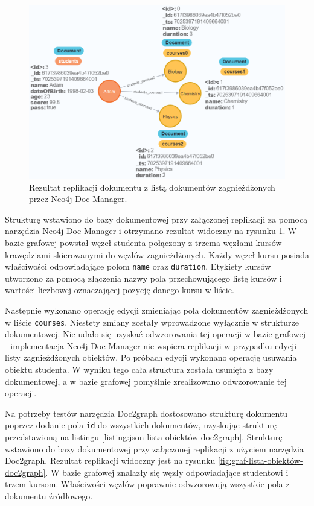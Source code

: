 \documentclass[a4paper,twoside,12pt]{book}
\begin{document}
\begin{figure}[h]
\centering
\includegraphics[width=11.4cm]{images/lista_obiektów_neo4jdocmanager.png}
\caption{Rezultat replikacji dokumentu z listą dokumentów zagnieżdżonych przez Neo4j Doc Manager.}
\label{fig:graf-lista-obiektów-neo4jdocmanager}
\end{figure}

Strukturę wstawiono do bazy dokumentowej przy załączonej replikacji za pomocą narzędzia Neo4j Doc Manager i otrzymano rezultat widoczny na rysunku \ref{fig:graf-lista-obiektów-neo4jdocmanager}. W bazie grafowej powstał węzeł studenta połączony z trzema węzłami kursów krawędziami skierowanymi do węzłów zagnieżdżonych. 
Każdy węzeł kursu posiada właściwości odpowiadające polom \texttt{name} oraz \texttt{duration}. Etykiety kursów utworzono za pomocą złączenia nazwy pola przechowującego listę kursów i wartości liczbowej oznaczającej pozycję danego kursu w liście.

Następnie wykonano operację edycji zmieniając pola dokumentów zagnieżdżonych w liście \texttt{courses}. Niestety zmiany zostały wprowadzone wyłącznie w strukturze dokumentowej. Nie udało się uzyskać odwzorowania tej operacji w bazie grafowej - implementacja Neo4j Doc Manager nie wspiera replikacji w przypadku edycji listy zagnieżdżonych obiektów. Po próbach edycji wykonano operację usuwania obiektu studenta. W wyniku tego cała struktura została usunięta z bazy dokumentowej, a w bazie grafowej pomyślnie zrealizowano odwzorowanie tej operacji. 

Na potrzeby testów narzędzia Doc2graph dostosowano strukturę dokumentu poprzez dodanie pola \texttt{id} do wszystkich dokumentów, uzyskując strukturę przedstawioną na listingu \ref{listing:json-lista-obiektów-doc2graph}. Strukturę wstawiono do bazy dokumentowej przy załączonej replikacji z użyciem narzędzia Doc2graph. Rezultat replikacji widoczny jest na rysunku \ref{fig:graf-lista-obiektów-doc2graph}. W bazie grafowej znalazły się węzły odpowiadające studentowi i trzem kursom. Właściwości węzłów poprawnie odwzorowują wszystkie pola z dokumentu źródłowego.
\end{document}
